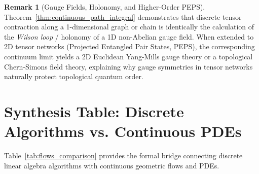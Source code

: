 \documentclass[11pt,a4paper,reqno]{amsart}
\theoremstyle{definition}
\newtheorem{remark}[theorem]{Remark}
\numberwithin{equation}{section}
\begin{document}
\begin{remark}[Gauge Fields, Holonomy, and Higher-Order PEPS]
Theorem~\ref{thm:continuous_path_integral} demonstrates that discrete tensor contraction along a 1-dimensional graph or chain is identically the calculation of the \emph{Wilson loop} / holonomy of a 1D non-Abelian gauge field. When extended to 2D tensor networks (Projected Entangled Pair States, PEPS), the corresponding continuum limit yields a 2D Euclidean Yang-Mills gauge theory or a topological Chern-Simons field theory, explaining why gauge symmetries in tensor networks naturally protect topological quantum order.
\end{remark}
\section{Synthesis Table: Discrete Algorithms vs. Continuous PDEs}
\label{sec:synthesis}

Table~\ref{tab:flows_comparison} provides the formal bridge connecting discrete linear algebra algorithms with continuous geometric flows and PDEs.
\end{document}
